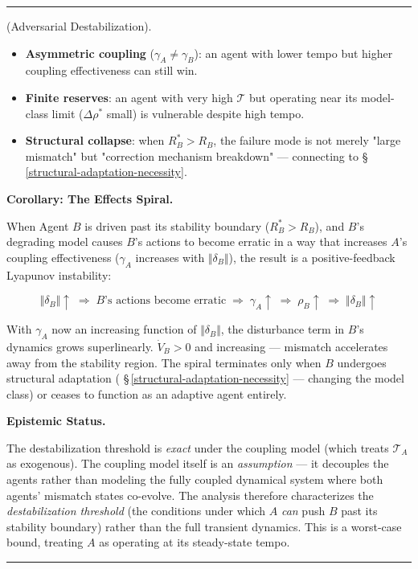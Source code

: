 \documentclass[11pt,oneside]{article}
\newcounter{claim}[section]
\renewcommand{\theclaim}{\thesection.\arabic{claim}}
\newenvironment{segment}[2]{%
  \refstepcounter{claim}%
  \bigskip\noindent\hrule\smallskip
  \noindent{\bfseries #1~\theclaim}\enskip(#2).\par\smallskip
  \noindent\ignorespaces
}{%
  \par\smallskip\noindent\hrule\bigskip
}
\newenvironment{proposition}[1][]{\begin{segment}{Proposition}{#1}}{\end{segment}}
\begin{document}
\begin{proposition}[Adversarial Destabilization]
\begin{itemize}
  \item \textbf{Asymmetric coupling} ($\gamma_A \neq \gamma_B$): an agent with lower tempo but higher coupling effectiveness can still win.
  \item \textbf{Finite reserves}: an agent with very high $\mathcal{T}$ but operating near its model-class limit ($\Delta\rho^*$ small) is vulnerable despite high tempo.
  \item \textbf{Structural collapse}: when $R^*_B > R_B$, the failure mode is not merely "large mismatch" but "correction mechanism breakdown" — connecting to \S\,\ref{structural-adaptation-necessity}.
\end{itemize}



\medskip\noindent\textbf{Corollary: The Effects Spiral.}


When Agent $B$ is driven past its stability boundary ($R^*_B > R_B$), and $B$'s degrading model causes $B$'s actions to become erratic in a way that increases $A$'s coupling effectiveness ($\gamma_A$ increases with $\Vert\delta_B\Vert$), the result is a positive-feedback Lyapunov instability:


$$\Vert\delta_B\Vert \uparrow \;\Rightarrow\; B\text{'s actions become erratic} \;\Rightarrow\; \gamma_A \uparrow \;\Rightarrow\; \rho_B \uparrow \;\Rightarrow\; \Vert\delta_B\Vert \uparrow$$

With $\gamma_A$ now an increasing function of $\Vert\delta_B\Vert$, the disturbance term in $B$'s dynamics grows superlinearly. $\dot{V}_B > 0$ and increasing — mismatch accelerates away from the stability region. The spiral terminates only when $B$ undergoes structural adaptation ( \S\,\ref{structural-adaptation-necessity} — changing the model class) or ceases to function as an adaptive agent entirely.


\medskip\noindent\textbf{Epistemic Status.}


The destabilization threshold is \textit{exact} under the coupling model (which treats $\mathcal{T}_A$ as exogenous). The coupling model itself is an \textit{assumption} — it decouples the agents rather than modeling the fully coupled dynamical system where both agents' mismatch states co-evolve. The analysis therefore characterizes the \textit{destabilization threshold} (the conditions under which $A$ \textit{can} push $B$ past its stability boundary) rather than the full transient dynamics. This is a worst-case bound, treating $A$ as operating at its steady-state tempo.


\end{proposition}
\end{document}
